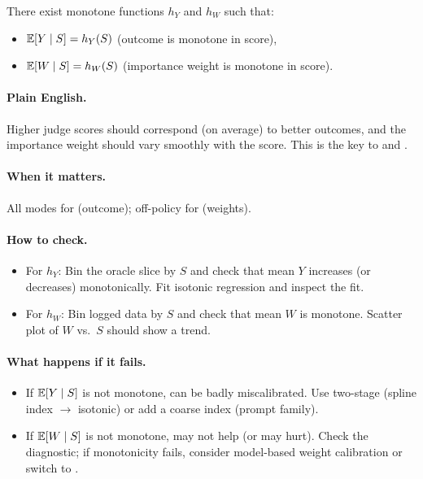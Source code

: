 \begin{assumption}
\label{assum:j2m}
There exist monotone functions $h_Y$ and $h_W$ such that:
\begin{itemize}
\item $\operatorname{\mathbb{E}}[Y \mid S] = h_Y(S)$ (outcome is monotone in score),
\item $\operatorname{\mathbb{E}}[W \mid S] = h_W(S)$ (importance weight is monotone in score).
\end{itemize}
\end{assumption}

\paragraph{Plain English.} Higher judge scores should correspond (on average) to better outcomes, and the importance weight should vary smoothly with the score. This is the key to \autocal{} and \simcal.

\paragraph{When it matters.} All modes for \autocal{} (outcome); off-policy for \simcal{} (weights).

\paragraph{How to check.} 
\begin{itemize}
\item For $h_Y$: Bin the oracle slice by $S$ and check that mean $Y$ increases (or decreases) monotonically. Fit isotonic regression and inspect the fit.
\item For $h_W$: Bin logged data by $S$ and check that mean $W$ is monotone. Scatter plot of $W$ vs.\ $S$ should show a trend.
\end{itemize}

\paragraph{What happens if it fails.}
\begin{itemize}
\item If $\operatorname{\mathbb{E}}[Y \mid S]$ is not monotone, \autocal{} can be badly miscalibrated. Use two-stage \autocal{} (spline index $\to$ isotonic) or add a coarse index (prompt family).
\item If $\operatorname{\mathbb{E}}[W \mid S]$ is not monotone, \simcal{} may not help (or may hurt). Check the diagnostic; if monotonicity fails, consider model-based weight calibration or switch to \dr.
\end{itemize}

